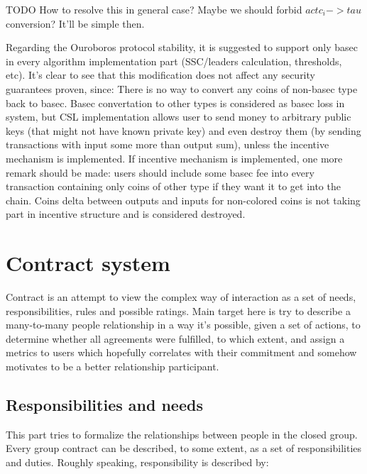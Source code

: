 \documentclass[]{itmo-student-thesis}
\begin{document}
TODO How to resolve this in general case? Maybe we should forbid
$actc_i -> tau$ conversion? It’ll be simple then.

Regarding the Ouroboros protocol stability, it is suggested to support
only basec in every algorithm implementation part (SSC/leaders
calculation, thresholds, etc). It’s clear to see that this
modification does not affect any security guarantees proven, since:
There is no way to convert any coins of non-basec type back to basec.
Basec convertation to other types is considered as basec loss in
system, but CSL implementation allows user to send money to arbitrary
public keys (that might not have known private key) and even destroy
them (by sending transactions with input some more than output sum),
unless the incentive mechanism is implemented. If incentive mechanism
is implemented, one more remark should be made: users should include
some basec fee into every transaction containing only coins of other
type if they want it to get into the chain. Coins delta between
outputs and inputs for non-colored coins is not taking part in
incentive structure and is considered destroyed.

\section{Contract system}

Contract is an attempt to view the complex way of interaction as a set
of needs, responsibilities, rules and possible ratings. Main target
here is try to describe a many-to-many people relationship in a way
it’s possible, given a set of actions, to determine whether all
agreements were fulfilled, to which extent, and assign a metrics to
users which hopefully correlates with their commitment and somehow
motivates to be a better relationship participant.

\subsection{Responsibilities and needs}

This part tries to formalize the relationships between people in the
closed group. Every group contract can be described, to some extent,
as a set of responsibilities and duties. Roughly speaking,
responsibility is described by:
\end{document}
